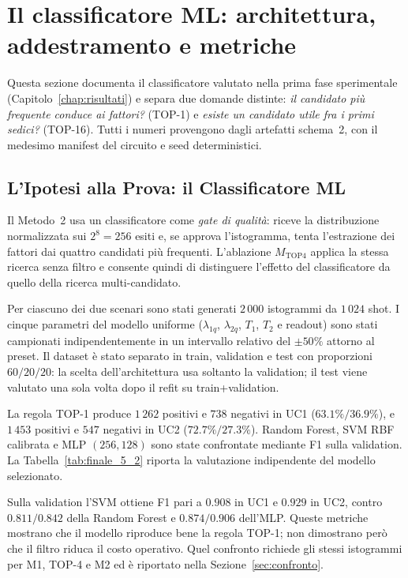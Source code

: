 \section{Il classificatore ML: architettura, addestramento e metriche}
\label{app:classificatore}
\begin{onehalfspace}

Questa sezione documenta il classificatore valutato nella prima fase
sperimentale (Capitolo~\ref{chap:risultati}) e separa due domande distinte:
\emph{il candidato più frequente conduce ai fattori?} (TOP-1) e
\emph{esiste un candidato utile fra i primi sedici?} (TOP-16). Tutti i
numeri provengono dagli artefatti schema~2, con il medesimo manifest del
circuito e seed deterministici.

\subsection{L'Ipotesi alla Prova: il Classificatore ML}
\label{sec:risultati_uc_m2}
\label{sec:valutazione_clf}

Il Metodo~2 usa un classificatore come \emph{gate di qualità}: riceve la
distribuzione normalizzata sui $2^8=256$ esiti e, se approva
l'istogramma, tenta l'estrazione dei fattori dai quattro candidati più
frequenti. L'ablazione $M_{\mathrm{TOP4}}$ applica la stessa ricerca senza
filtro e consente quindi di distinguere l'effetto del classificatore da
quello della ricerca multi-candidato.

Per ciascuno dei due scenari sono stati generati $2\,000$ istogrammi da
$1\,024$ shot. I cinque parametri del modello uniforme
($\lambda_{1q}$, $\lambda_{2q}$, $T_1$, $T_2$ e readout) sono stati
campionati indipendentemente in un intervallo relativo del $\pm50\%$
attorno al preset. Il dataset è stato separato in train, validation e
test con proporzioni $60/20/20$: la scelta dell'architettura usa soltanto
la validation; il test viene valutato una sola volta dopo il refit su
train+validation.

La regola TOP-1 produce $1\,262$ positivi e $738$ negativi in UC1
($63.1\%/36.9\%$), e $1\,453$ positivi e $547$ negativi in UC2
($72.7\%/27.3\%$). Random Forest, \ac{SVM} RBF calibrata e \ac{MLP}
$(256,128)$ sono state confrontate mediante F1 sulla validation. La
Tabella~\ref{tab:finale_5_2} riporta la valutazione indipendente del
modello selezionato.


Sulla validation l'\ac{SVM} ottiene F1 pari a $0.908$ in UC1 e $0.929$
in UC2, contro $0.811/0.842$ della Random Forest e $0.874/0.906$
dell'\ac{MLP}. Queste metriche mostrano che il modello riproduce bene la
regola TOP-1; non dimostrano però che il filtro riduca il costo operativo.
Quel confronto richiede gli stessi istogrammi per M1, TOP-4 e M2 ed è
riportato nella Sezione~\ref{sec:confronto}.


\end{onehalfspace}
